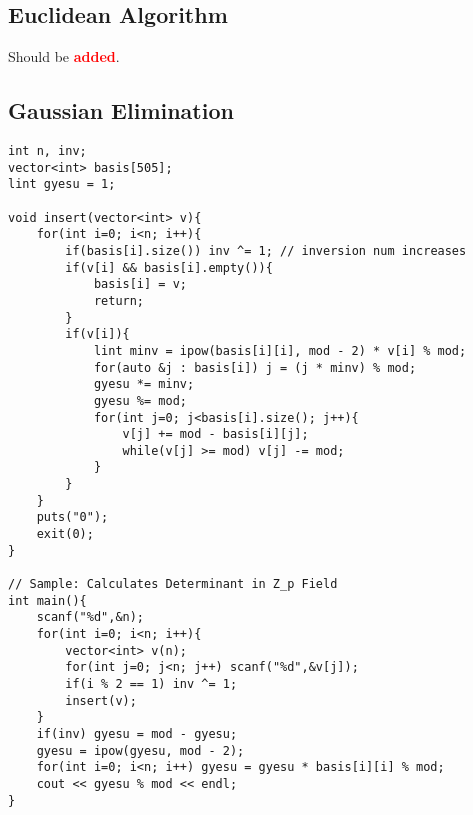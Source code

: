 \documentclass[landscape, 8pt, a4paper, oneside, twocolumn]{extarticle}
\newcommand{\added}{Should be \textcolor{red}{\textbf{added}}.}
\begin{document}
\subsection{Euclidean Algorithm}
\added
\subsection{Gaussian Elimination}
\begin{verbatim}
int n, inv;
vector<int> basis[505];
lint gyesu = 1;

void insert(vector<int> v){
	for(int i=0; i<n; i++){
		if(basis[i].size()) inv ^= 1; // inversion num increases
		if(v[i] && basis[i].empty()){
			basis[i] = v;
			return;
		}
		if(v[i]){
			lint minv = ipow(basis[i][i], mod - 2) * v[i] % mod;
			for(auto &j : basis[i]) j = (j * minv) % mod;
			gyesu *= minv;
			gyesu %= mod;
			for(int j=0; j<basis[i].size(); j++){
				v[j] += mod - basis[i][j];
				while(v[j] >= mod) v[j] -= mod;
			}
		}
	}
	puts("0");
	exit(0);
}

// Sample: Calculates Determinant in Z_p Field
int main(){
	scanf("%d",&n);
	for(int i=0; i<n; i++){
		vector<int> v(n);
		for(int j=0; j<n; j++) scanf("%d",&v[j]);
		if(i % 2 == 1) inv ^= 1;
		insert(v);
	}
	if(inv) gyesu = mod - gyesu;
	gyesu = ipow(gyesu, mod - 2);
	for(int i=0; i<n; i++) gyesu = gyesu * basis[i][i] % mod;
	cout << gyesu % mod << endl; 
}
\end{verbatim}
\end{document}
